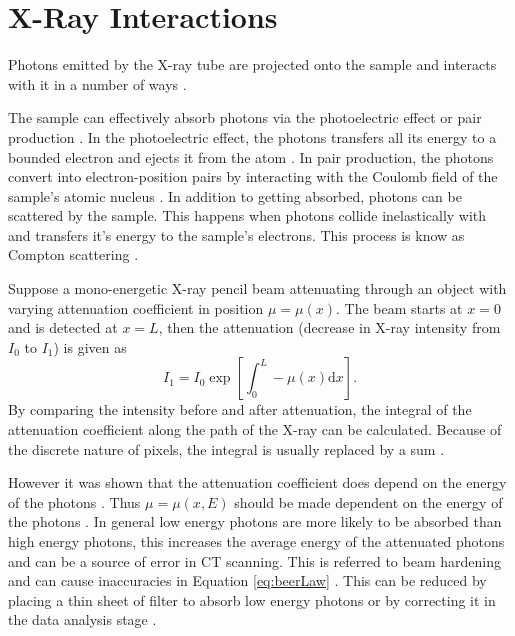 \documentclass[12pt]{report}
\newcommand{\diff}{\mathrm{d}}
\begin{document}
\section{X-Ray Interactions}
Photons emitted by the X-ray tube are projected onto the sample and interacts with it in a number of ways \cite{cantatore2011introduction}.

The sample can effectively absorb photons via the photoelectric effect or pair production \cite{cantatore2011introduction}. In the photoelectric effect, the photons transfers all its energy to a bounded electron and ejects it from the atom \cite{millikan1916direct}. In pair production, the photons convert into electron-position pairs by interacting with the Coulomb field of the sample's atomic nucleus \cite{hubbell2006electron}. In addition to getting absorbed, photons can be scattered by the sample. This happens when photons collide inelastically with and transfers it's energy to the sample's electrons. This process is know as Compton scattering \cite{compton1923quantum}.

Suppose a mono-energetic X-ray pencil beam attenuating through an object with varying attenuation coefficient in position $\mu=\mu(x)$. The beam starts at $x=0$ and is detected at $x=L$, then the attenuation (decrease in X-ray intensity from $I_0$ to $I_1$) is given as \cite{cantatore2011introduction}
\begin{equation}
I_1 = I_0\exp\left[\int_0^L-\mu(x)\diff x\right].
\label{eq:beerLaw}
\end{equation}
By comparing the intensity before and after attenuation, the integral of the attenuation coefficient along the path of the X-ray can be calculated. Because of the discrete nature of pixels, the integral is usually replaced by a sum \cite{michael2001x}. 

However it was shown that the attenuation coefficient does depend on the energy of the photons \cite{elbakri2002statistical}. Thus $\mu=\mu(x,E)$ should be made dependent on the energy of the photons \cite{cantatore2011introduction}. In general low energy photons are more likely to be absorbed than high energy photons, this increases the average energy of the attenuated photons and can be a source of error in CT scanning. This is referred to beam hardening and can cause inaccuracies in Equation \eqref{eq:beerLaw} \cite{michael2001x}. This can be reduced by placing a thin sheet of filter to absorb low energy photons \cite{welkenhuyzen2009industrial} or by correcting it in the data analysis stage \cite{michael2001x}.
\end{document}
